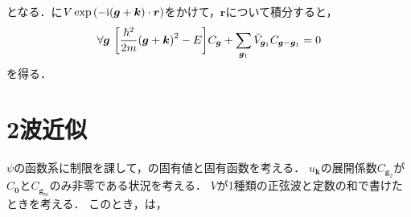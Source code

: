 \documentclass{report}
\begin{document}
      となる．に$V\exp\qty(-\mathrm{i} (\bm{g} + \bm{k})\cdot \bm{r})$をかけて，$\bm{r}$について積分すると，
      \begin{align}
        \forall \bm{g}\ \qty[\frac{\hbar^2}{2m}\qty(\bm{g} + \bm{k})^2 - E] C_{\bm{g}} + \sum_{\bm{g}_1}\tilde{V}_{\bm{g}_1}C_{\bm{g} - \bm{g}_1} = 0 \label{schrodinger-fourier-2}
      \end{align}
      を得る．
    \section{2波近似}
      $\psi$の函数系に制限を課して，の固有値と固有函数を考える．
      $u_{\bm{k}}$の展開係数$C_{\bm{g}_2}$が$C_{\bm{0}}$と$C_{\bm{g}_m}$のみ非零である状況を考える．
      $V$が1種類の正弦波と定数の和で書けたときを考える．
      このとき，は，
\end{document}

